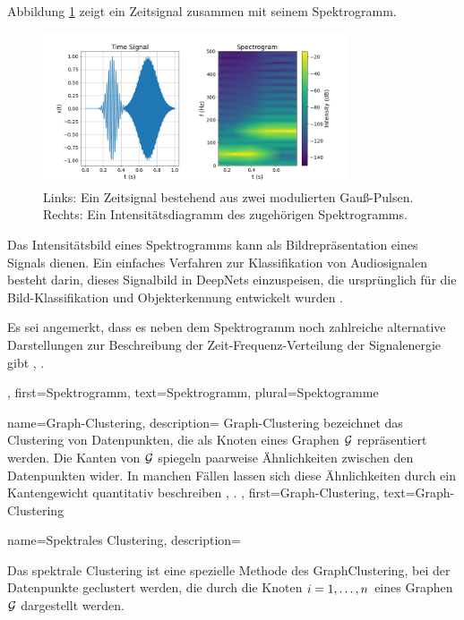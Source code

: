 {{{{{{		Abbildung \ref{fig:spectrogram_dict} zeigt ein Zeitsignal zusammen mit seinem Spektrogramm.
		
		\begin{figure}[H]
			\centering
			\includegraphics[width=0.8\textwidth]{assets/spectrogram.png}
			\caption{Links: Ein Zeitsignal bestehend aus zwei modulierten Gauß-Pulsen. Rechts: Ein Intensitätsdiagramm des zugehörigen Spektrogramms.
				\label{fig:spectrogram_dict}}
		\end{figure}
		
		Das Intensitätsbild eines Spektrogramms kann als Bildrepräsentation eines Signals dienen. Ein einfaches Verfahren zur \gls{Klassifikation} von Audiosignalen besteht darin, dieses Signalbild in \gls{DeepNet}s einzuspeisen, die ursprünglich für die Bild-\gls{Klassifikation} und Objekterkennung entwickelt wurden \cite{Li:2022aa}.
		
		Es sei angemerkt, dass es neben dem Spektrogramm noch zahlreiche alternative Darstellungen zur Beschreibung der Zeit-Frequenz-Verteilung der Signalenergie gibt \cite{TimeFrequencyAnalysisBoashash}, \cite{MallatBook}.
	},
	first={Spektrogramm},
	text={Spektrogramm}, plural={Spektogramme}
}

{
	name={Graph-Clustering},
	description={
		\Gls{Graph}-\gls{Clustering} bezeichnet das \gls{Clustering} von \gls{Datenpunkten}, 
		die als Knoten eines \gls{Graphen} $\mathcal{G}$ repräsentiert werden. Die Kanten von $\mathcal{G}$ 
		spiegeln paarweise Ähnlichkeiten zwischen den \gls{Datenpunkten} wider. In manchen Fällen 
		lassen sich diese Ähnlichkeiten durch ein \gls{Kantengewicht} quantitativ beschreiben \cite{FlowSpecClustering2021}, \cite{Luxburg2007}.
	},
	first={Graph-Clustering},
	text={Graph-Clustering}
}


{
	name={Spektrales Clustering},
	description={
		Das spektrale \gls{Clustering} ist eine spezielle Methode des \gls{GraphClustering}, 
		bei der \gls{Datenpunkte} geclustert werden, die durch die Knoten $i = 1, \ldots, n$ eines 
		\gls{Graphen} $\mathcal{G}$ dargestellt werden. 
		
}}}}}}
